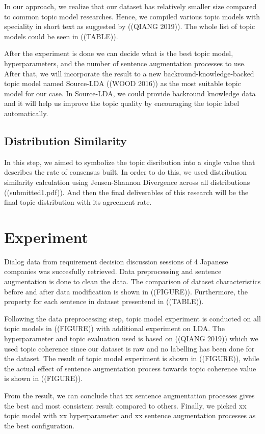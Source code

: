 \documentclass[conference]{IEEEtran}
\begin{document}
In our approach, we realize that our dataset has relatively smaller size compared to common topic model researches. Hence, we compiled various topic models with speciality in short text as suggested by ((QIANG 2019)). The whole list of topic models could be seen in ((TABLE)).

After the experiment is done we can decide what is the best topic model, hyperparameters, and the number of sentence augmentation processes to use. After that, we will incorporate the result to a new backround-knowledge-backed topic model named Source-LDA ((WOOD 2016)) as the most suitable topic model for our case. In Source-LDA, we could provide backround knowledge data and it will help us improve the topic quality by encouraging the topic label automatically.

\subsection{Distribution Similarity}
In this step, we aimed to symbolize the topic disribution into a single value that describes the rate of consensus built. In order to do this, we used distribution similarity calculation using Jensen-Shannon Divergence across all distributions ((submitted1.pdf)). And then the final deliverables of this research will be the final topic distribution with its agreement rate.

\section{Experiment}
Dialog data from requirement decision discussion sessions of 4 Japanese companies was succesfully retrieved. Data preprocessing and sentence augmentation is done to clean the data. The comparison of dataset characteristics before and after data modification is shown in ((FIGURE)). Furthermore, the property for each sentence in dataset presentend in ((TABLE)).

Following the data preprocessing step, topic model experiment is conducted on all topic models in ((FIGURE)) with additional experiment on LDA. The hyperparameter and topic evaluation used is based on ((QIANG 2019)) which we used topic coherence since our dataset is raw and no labelling has been done for the dataset. The result of topic model experiment is shown in ((FIGURE)), while the actual effect of sentence augmentation process towards topic coherence value is shown in ((FIGURE)).

From the result, we can conclude that xx sentence augmentation processes gives the best and most consistent result compared to others.  Finally, we picked xx topic model with xx hyperparameter and xx sentence augmentation processes as the best configuration. 
\end{document}
